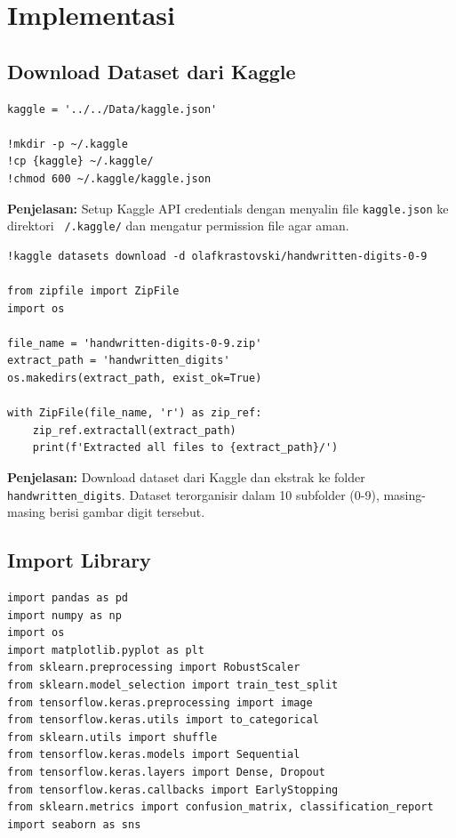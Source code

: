 \documentclass[12pt,a4paper]{article}
\begin{document}
\section{Implementasi}

\subsection{Download Dataset dari Kaggle}

\begin{lstlisting}[caption=Konfigurasi Kaggle API]
kaggle = '../../Data/kaggle.json'

!mkdir -p ~/.kaggle
!cp {kaggle} ~/.kaggle/
!chmod 600 ~/.kaggle/kaggle.json
\end{lstlisting}

\textbf{Penjelasan:} Setup Kaggle API credentials dengan menyalin file \texttt{kaggle.json} ke direktori \texttt{~/.kaggle/} dan mengatur permission file agar aman.

\begin{lstlisting}[caption=Download dan Ekstraksi Dataset]
!kaggle datasets download -d olafkrastovski/handwritten-digits-0-9

from zipfile import ZipFile
import os

file_name = 'handwritten-digits-0-9.zip'
extract_path = 'handwritten_digits'
os.makedirs(extract_path, exist_ok=True)

with ZipFile(file_name, 'r') as zip_ref:
    zip_ref.extractall(extract_path)
    print(f'Extracted all files to {extract_path}/')
\end{lstlisting}

\textbf{Penjelasan:} Download dataset dari Kaggle dan ekstrak ke folder \texttt{handwritten\_digits}. Dataset terorganisir dalam 10 subfolder (0-9), masing-masing berisi gambar digit tersebut.

\subsection{Import Library}

\begin{lstlisting}[caption=Import Library yang Diperlukan]
import pandas as pd
import numpy as np
import os
import matplotlib.pyplot as plt
from sklearn.preprocessing import RobustScaler
from sklearn.model_selection import train_test_split
from tensorflow.keras.preprocessing import image
from tensorflow.keras.utils import to_categorical
from sklearn.utils import shuffle
from tensorflow.keras.models import Sequential
from tensorflow.keras.layers import Dense, Dropout
from tensorflow.keras.callbacks import EarlyStopping
from sklearn.metrics import confusion_matrix, classification_report
import seaborn as sns
\end{lstlisting}
\end{document}
